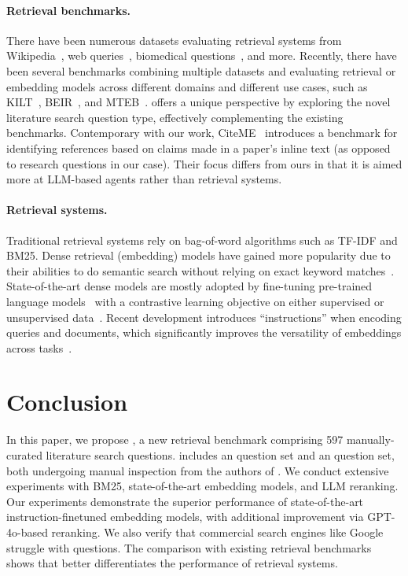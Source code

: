 \paragraph{Retrieval benchmarks.}
There have been numerous datasets evaluating 
retrieval systems from
Wikipedia~\citep{kwiatkowski2019natural,lee-etal-2019-latent},
web queries~\citep{nguyen2017ms}, 
biomedical questions~\citep{voorhees2000building_trec}, and more.
Recently, there have been several benchmarks
combining multiple datasets 
and evaluating retrieval or embedding models 
across different domains and different use cases, such as KILT~\citep{petroni-etal-2021-kilt}, BEIR~\citep{thakur2021beir}, and MTEB~\citep{muennighoff2022mteb}.
\ours{} offers a unique perspective 
by exploring the novel literature search question type, 
effectively complementing the existing benchmarks.
Contemporary with our work, CiteME~\citep{press2024citemelanguagemodelsaccurately} introduces a benchmark for identifying references based on claims made in a paper's inline text (as opposed to research questions in our case). Their focus differs from ours in that it is aimed more at LLM-based agents rather than retrieval systems.

\paragraph{Retrieval systems.} 
Traditional retrieval systems rely on bag-of-word algorithms such as TF-IDF and BM25. 
Dense retrieval (embedding) models have gained more popularity due to their abilities to do semantic search without relying on exact keyword matches~\cite{pennington-etal-2014-glove,reimers2019sentence}.
State-of-the-art dense models 
are mostly adopted by
fine-tuning pre-trained language models~\citep{devlin2019bert,touvron2023llama}
with a contrastive learning objective on either supervised or unsupervised data~\citep{karpukhin-etal-2020-dense,gao-etal-2021-simcse,izacard2022unsupervised,ni-etal-2022-large, Khattab2020ColBERTEA}.
Recent development introduces ``instructions'' when encoding  queries and  documents, which significantly improves the versatility of embeddings across  tasks~\citep{su-etal-2023-one, Wang2022TextEB, wu2022grit, lee2024nvembed, behnamghader2024llm2vec}.

\section{Conclusion}
In this paper, we propose \ours{},
a new retrieval benchmark comprising 597 manually-curated literature search questions.
\ours{} includes an \inlineq{} question set and an \authorq{} question set, both undergoing manual inspection from the authors of \ours{}.
We conduct extensive experiments with BM25, state-of-the-art embedding models, and LLM reranking. 
Our experiments demonstrate the superior performance of state-of-the-art instruction-finetuned embedding models, 
with additional improvement via GPT-4o-based reranking.
We also verify that commercial search engines like Google struggle with \ours{} questions.
The comparison with existing retrieval benchmarks shows that 
\ours{} better differentiates the performance of retrieval systems.

